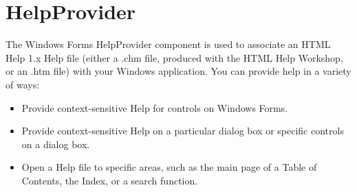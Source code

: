\section{HelpProvider}
%
%
%
%
%
%
%
%
%
%

The Windows Forms HelpProvider component is used to associate an HTML Help 1.x Help file (either a .chm file, produced with the HTML Help Workshop, or an .htm file) with your Windows application. You can provide help in a variety of ways:
\begin{itemize}
	\item Provide context-sensitive Help for controls on Windows Forms.
	
	\item Provide context-sensitive Help on a particular dialog box or specific controls on a dialog box.
	
	\item Open a Help file to specific areas, such as the main page of a Table of Contents, the Index, or a search function.
\end{itemize}

